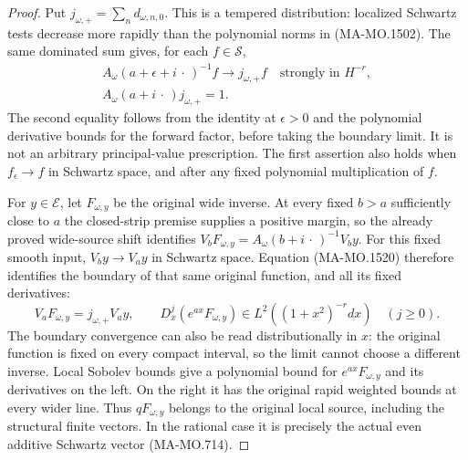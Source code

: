 \begin{proof}
Put $j_{\omega,+}=\sum_n d_{\omega,n,0}$.  This is a tempered
distribution: localized Schwartz tests decrease more rapidly
than the polynomial norms in (MA-MO.1502).  The same dominated
sum gives, for each $f\in\mathscr S$,
\[
\begin{gathered}
 A_\omega(a+\epsilon+i\,\cdot\,)^{-1}f
       \longrightarrow j_{\omega,+}f
                             \quad\text{strongly in }H^{-r},\\
 A_\omega(a+i\,\cdot\,)j_{\omega,+}=1 .
\end{gathered}
\tag{MA-MO.1520}
\]
The second equality follows from the identity at $\epsilon>0$
and the polynomial derivative bounds for the forward factor,
before taking the boundary limit.  It is not an arbitrary
principal-value prescription.  The first assertion also holds
when $f_\epsilon\to f$ in Schwartz space, and after any fixed
polynomial multiplication of $f$.

For $y\in\mathcal E$, let $F_{\omega,y}$ be the original
wide inverse.  At every fixed $b>a$ sufficiently close to $a$
the closed-strip premise supplies a positive margin, so the
already proved wide-source shift identifies
$V_bF_{\omega,y}=A_\omega(b+i\,\cdot\,)^{-1}V_by$.
For this fixed smooth input, $V_by\to V_ay$ in Schwartz space.
Equation (MA-MO.1520) therefore identifies the boundary of
that same original function, and all its fixed derivatives:
\[
 V_aF_{\omega,y}=j_{\omega,+}V_ay,\qquad
 D_x^j(e^{ax}F_{\omega,y})
                   \in L^2((1+x^2)^{-r}dx)\quad(j\ge0).
\tag{MA-MO.1521}
\]
The boundary convergence can also be read distributionally
in $x$: the original function is fixed on every compact
interval, so the limit cannot choose a different inverse.
Local Sobolev bounds give a polynomial bound for
$e^{ax}F_{\omega,y}$ and its derivatives on the left.
On the right it has the original rapid weighted bounds
at every wider line.  Thus $qF_{\omega,y}$ belongs to the
original local source, including the structural finite
vectors.  In the rational case it is precisely the actual
even additive Schwartz vector (MA-MO.714).


\end{proof}
